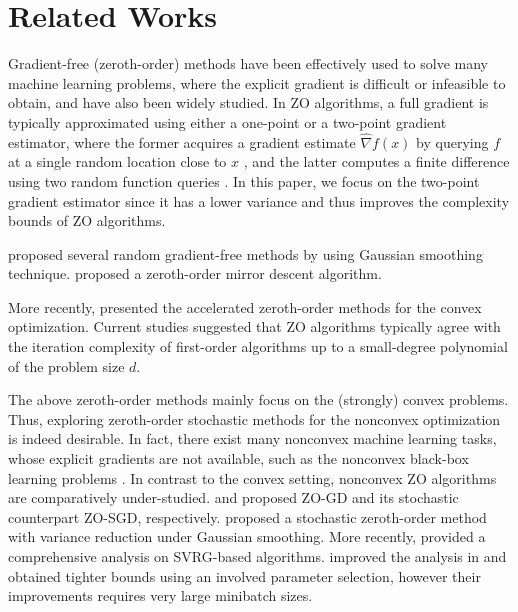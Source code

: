 \documentclass{article}
\theoremstyle{definition}
\theoremstyle{remark}
\begin{document}
\section{Related Works}
{\color{Green}
Gradient-free (zeroth-order) methods have been effectively used to solve many machine learning problems, where the explicit gradient is difficult or infeasible to obtain, and have also been widely studied. 
{\color{Brown}
In ZO algorithms, a full gradient is typically approximated using either a one-point or a two-point gradient estimator, where the former acquires a gradient estimate $\hat{\nabla} f(x)$ by querying $f$ at a single random location close to $x$ \cite{flaxman2005online,shamir2013complexity}, and the latter computes a finite difference using two random function queries \cite{agarwal2010optimal,nesterov2017random}. In this paper, we focus on the two-point gradient estimator since it has a lower variance and thus improves the complexity bounds of ZO algorithms.
}

\cite{nesterov2017random} proposed several random gradient-free
methods by using Gaussian smoothing technique. \cite{duchi2015optimal} proposed a zeroth-order mirror descent algorithm. 

{\color{Brown}

 More recently, \cite{yu2018generic,dvurechensky2018accelerated} presented the accelerated zeroth-order methods for the convex optimization. Current studies suggested that ZO algorithms typically agree with the iteration complexity of first-order
algorithms up to a small-degree polynomial of the problem size $d$.

{\color{Green} The above zeroth-order methods mainly focus on the
(strongly) convex problems. Thus, exploring zeroth-order stochastic methods for the nonconvex optimization is indeed desirable. In fact, there exist many nonconvex machine learning tasks, whose explicit gradients are not available, such as the nonconvex black-box learning problems \cite{chen2017zoo,liu2018zeroth}. 
{\color{Brown}
In contrast to the convex setting, nonconvex ZO algorithms are comparatively under-studied.
}
{\color{YellowOrange}
\cite{ghadimi2013stochastic} and \cite{nesterov2011random} proposed ZO-GD and
its stochastic counterpart ZO-SGD, respectively. \cite{liu2018stochastic} proposed a stochastic
zeroth-order method with variance reduction under Gaussian smoothing. More recently, \cite{liu2018zeroth} provided a comprehensive analysis on SVRG-based algorithms. \cite{ji2019improved} improved the analysis in \cite{liu2018zeroth} and obtained tighter bounds using an involved parameter selection, however their improvements requires very large minibatch sizes. 
}

}}}
\end{document}
